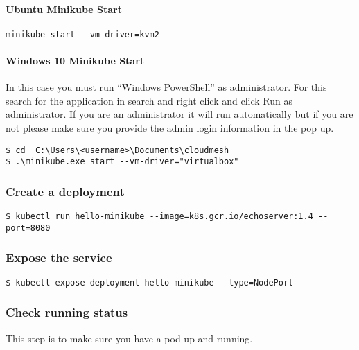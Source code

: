 \paragraph{Ubuntu Minikube Start}\label{ubuntu-minikube-start}

\begin{verbatim}
minikube start --vm-driver=kvm2
\end{verbatim}

\paragraph{Windows 10 Minikube Start}\label{windows-10-minikube-start}

In this case you must run ``Windows PowerShell'' as administrator. For
this search for the application in search and right click and click Run
as administrator. If you are an administrator it will run automatically
but if you are not please make sure you provide the admin login
information in the pop up.

\begin{verbatim}
$ cd  C:\Users\<username>\Documents\cloudmesh
$ .\minikube.exe start --vm-driver="virtualbox"
\end{verbatim}

\subsubsection{Create a deployment}\label{create-a-deployment}

\begin{verbatim}
$ kubectl run hello-minikube --image=k8s.gcr.io/echoserver:1.4 --port=8080
\end{verbatim}

\subsubsection{Expose the service}\label{expose-the-service}

\begin{verbatim}
$ kubectl expose deployment hello-minikube --type=NodePort
\end{verbatim}

\subsubsection{Check running status}\label{check-running-status}

This step is to make sure you have a pod up and running.

